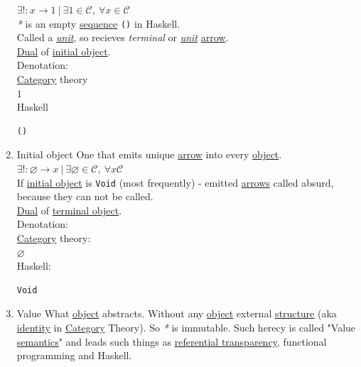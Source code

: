 \documentclass[a4paper,14pt,oneside]{book}
\begin{document}
\begin{enumerate}
\(\exists ! : x \to 1 \ | \ \exists 1 \in \mathcal{C}, \ \forall x \in \mathcal{C}\)\\

\emph{*} is an empty \hyperref[org937a05c]{sequence} \texttt{()} in Haskell.\\

Called a \emph{\hyperref[org7580d7d]{unit}}, so recieves \emph{terminal} or \emph{\hyperref[org7580d7d]{unit}} \hyperref[orga2011ae]{arrow}.\\

\hyperref[orgcc2faae]{Dual} of \hyperref[org1d08e46]{initial object}.\\

Denotation:\\

\hyperref[org64eee11]{Category} theory\\
\(1\)\\

Haskell\\
\begin{verbatim}
()
\end{verbatim}

\item \label{org1d08e46}Initial object
\label{sec:org2e780a1}
One that emits unique \hyperref[orga2011ae]{arrow} into every \hyperref[org75b9876]{object}.\\

\(\exists ! : \varnothing \to x \ | \ \exists \varnothing \in \mathcal{C}, \ \forall x \mathcal{C}\)\\

If \hyperref[org1d08e46]{initial object} is \texttt{Void} (most frequently) - emitted \hyperref[org15cb233]{arrows} called absurd, because they can not be called.\\

\hyperref[orgcc2faae]{Dual} of \hyperref[orgf5f11cd]{terminal object}.\\

Denotation:\\

\hyperref[org64eee11]{Category} theory:\\
\(\varnothing\)\\

Haskell:\\
\begin{verbatim}
Void
\end{verbatim}

\item Value
\label{sec:orgccba17e}
What \hyperref[org75b9876]{object} abstracts. Without any \hyperref[org75b9876]{object} external \hyperref[org04b27c9]{structure} (aka \hyperref[org1beefff]{identity} in \hyperref[org64eee11]{Category} Theory). So \emph{*} is immutable. Such herecy is called "Value \hyperref[org83ac847]{semantics}" and leads such things as \hyperref[org259d5d2]{referential transparency}, functional programming and Haskell.\\


\end{enumerate}
\end{document}
